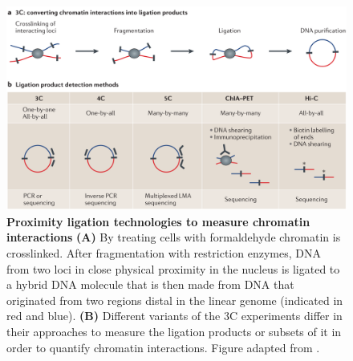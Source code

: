 \documentclass[a4paper,twoside=true,openright,parskip=full,chapterprefix=true,11pt,headings=normal,bibliography=totoc,listof=totoc,titlepage=on,captions=tableabove,draft=false]{scrreprt}
\theoremstyle{definition}
\theoremstyle{definition}
\theoremstyle{definition}
\theoremstyle{remark}
\begin{document}
\begin{figure}

{\centering \includegraphics[width=0.8\linewidth]{figures/Dekker2013_3C} 

}

\caption{\textbf{Proximity ligation technologies to
measure chromatin interactions} \textbf{(A)} By treating cells with
formaldehyde chromatin is crosslinked. After fragmentation with
restriction enzymes, DNA from two loci in close physical proximity in
the nucleus is ligated to a hybrid DNA molecule that is then made from
DNA that originated from two regions distal in the linear genome
(indicated in red and blue). \textbf{(B)} Different variants of the 3C
experiments differ in their approaches to measure the ligation products
or subsets of it in order to quantify chromatin interactions. Figure
adapted from \citep{Dekker2013}.}\label{fig:ProximityLigation}
\end{figure}
\end{document}
